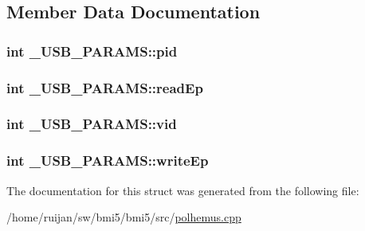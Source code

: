 \subsection{Member Data Documentation}
\hypertarget{struct__USB__PARAMS_abd24ffdfcb179d8c5a17d0f06e7d41ba}{
\subsubsection[{pid}]{\setlength{\rightskip}{0pt plus 5cm}int \-\_\-\-U\-S\-B\-\_\-\-P\-A\-R\-A\-M\-S\-::pid}}\label{struct__USB__PARAMS_abd24ffdfcb179d8c5a17d0f06e7d41ba}
\hypertarget{struct__USB__PARAMS_af7d02802b70f5545b083c2bff2ec4944}{
\subsubsection[{read\-Ep}]{\setlength{\rightskip}{0pt plus 5cm}int \-\_\-\-U\-S\-B\-\_\-\-P\-A\-R\-A\-M\-S\-::read\-Ep}}\label{struct__USB__PARAMS_af7d02802b70f5545b083c2bff2ec4944}
\hypertarget{struct__USB__PARAMS_af331972c7a1ef36ad4abeb533ea7642e}{
\subsubsection[{vid}]{\setlength{\rightskip}{0pt plus 5cm}int \-\_\-\-U\-S\-B\-\_\-\-P\-A\-R\-A\-M\-S\-::vid}}\label{struct__USB__PARAMS_af331972c7a1ef36ad4abeb533ea7642e}
\hypertarget{struct__USB__PARAMS_aad4fdc18f2b5d8f76fd85e0c9b38150e}{
\subsubsection[{write\-Ep}]{\setlength{\rightskip}{0pt plus 5cm}int \-\_\-\-U\-S\-B\-\_\-\-P\-A\-R\-A\-M\-S\-::write\-Ep}}\label{struct__USB__PARAMS_aad4fdc18f2b5d8f76fd85e0c9b38150e}


The documentation for this struct was generated from the following file\-:\begin{DoxyCompactItemize}
\item 
/home/ruijan/sw/bmi5/bmi5/src/\hyperlink{polhemus_8cpp}{polhemus.\-cpp}\end{DoxyCompactItemize}
